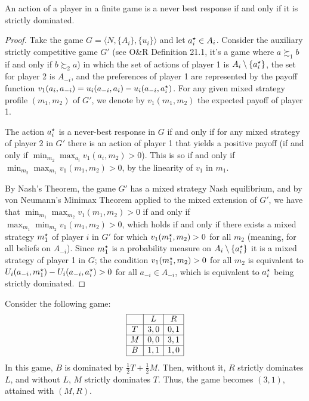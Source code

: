\documentclass[10pt]{article}
\begin{document}
\begin{lemma}
	An action of a player in a finite game is a never best response if and only if it is strictly dominated.
\end{lemma}
\begin{proof}
	Take the game $G = \langle N,\{A_i\},\{u_i\}\rangle$ and let $a_i^\star \in A_i$. Consider the auxiliary strictly competitive game $G'$ (see O\&R Definition 21.1, it's a game where $a \succsim_1 b$ if and only if $b \succsim_2 a$) in which the set of actions of player 1 is $A_i \setminus \{a_i^\star\}$, the set for player 2 is $A_{-i}$, and the preferences of player 1 are represented by the payoff function $v_1(a_i,a_{-i}) = u_i(a_{-i},a_i) - u_i(a_{-i},a^\star_i)$. For any given mixed strategy profile $(m_1,m_2)$ of $G'$, we denote by $v_1(m_1,m_2)$ the expected payoff of player 1.
	
	The action $a_i^\star$ is a never-best response in $G$ if and only if for any mixed strategy of player 2 in $G'$ there is an action of player 1 that yields a positive payoff (\ie if and only if $\min_{m_2} \max_{a_i} v_1(a_i,m_2) > 0$). This is so if and only if $\min_{m_2} \max_{m_1} v_1(m_1,m_2) > 0$, by the linearity of $v_1$ in $m_1$. 
	
	By Nash's Theorem, the game $G'$ has a mixed strategy Nash equilibrium, and by von Neumann's Minimax Theorem applied to the mixed extension of $G'$, we have that $\min_{m_1}\max_{m_2} v_1(m_1,m_2) > 0$ if and only if $\max_{m_1}\min_{m_2} v_1(m_1,m_2) > 0$, which holds if and only if there exists a mixed strategy $m_1^\star$ of player $i$ in $G'$ for which $v_1(m_1^\star,m_2) > 0$ for all $m_2$ (meaning, for all beliefs on $A_{-i}$). Since $m_1^\star$ is a probability measure on $A_i \setminus \{a_i^\star\}$ it is a mixed strategy of player 1 in $G$; the condition $v_1(m_1^\star,m_2) > 0$ for all $m_2$ is equivalent to $U_i(a_{-i},m_1^\star) - U_i(a_{-i},a^\star_i) > 0$ for all $a_{-i} \in A_{-i}$, which is equivalent to $a_i^\star$ being strictly dominated.
\end{proof}

\begin{example}
	 Consider the following game:
	\[
	\begin{array}{|c|c|c|}
		\hline & L & R \\\hline
		T & 3,0 & 0,1 \\\hline 
		M & 0,0 & 3,1 \\\hline 
		B & 1,1 & 1,0 \\\hline 
	\end{array}
	\]
	In this game, $B$ is dominated by $\frac{1}{2}T + \frac{1}{2}M$. Then, without it, $R$ strictly dominates $L$, and without $L$, $M$ strictly dominates $T$. Thus, the game becomes $(3,1)$, attained with $(M,R)$.
\end{example}
\end{document}
